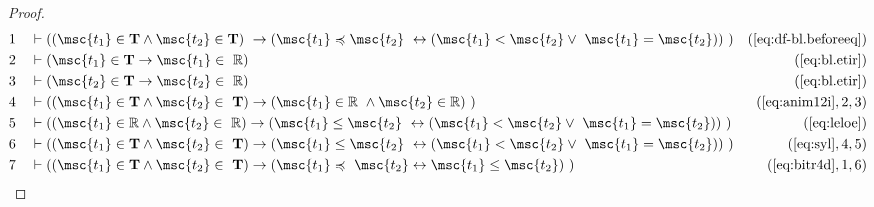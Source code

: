\begin{proof}
\begin{align}
  1 &&  & \vdash ( ( \msc{t_1} \in \mathbf{T} \wedge \msc{t_2} \in \mathbf{T} )
     ~\rightarrow ( \msc{t_1} \preccurlyeq \msc{t_2}
     ~\leftrightarrow ( \msc{t_1} < \msc{t_2} \vee
     ~\msc{t_1} = \msc{t_2} ) )
     ~)&(\mbox{\ref{eq:df-bl.beforeeq}})\notag
  \\ 2 &&  & \vdash ( \msc{t_1} \in \mathbf{T} \rightarrow \msc{t_1} \in
     ~\mathbb{R} )&(\mbox{\ref{eq:bl.etir}})\notag
  \\ 3 &&  & \vdash ( \msc{t_2} \in \mathbf{T} \rightarrow \msc{t_2} \in
     ~\mathbb{R} )&(\mbox{\ref{eq:bl.etir}})\notag
  \\ 4 &&  & \vdash ( ( \msc{t_1} \in \mathbf{T} \wedge \msc{t_2} \in
     ~\mathbf{T} ) \rightarrow ( \msc{t_1} \in \mathbb{R}
     ~\wedge \msc{t_2} \in \mathbb{R} )
     ~)&(\mbox{\ref{eq:anim12i}},2,3)\notag
  \\ 5 &&  & \vdash ( ( \msc{t_1} \in \mathbb{R} \wedge \msc{t_2} \in
     ~\mathbb{R} ) \rightarrow ( \msc{t_1} \le \msc{t_2}
     ~\leftrightarrow ( \msc{t_1} < \msc{t_2} \vee
     ~\msc{t_1} = \msc{t_2} ) )
     ~)&(\mbox{\ref{eq:leloe}})\notag
  \\ 6 &&  & \vdash ( ( \msc{t_1} \in \mathbf{T} \wedge \msc{t_2} \in
     ~\mathbf{T} ) \rightarrow ( \msc{t_1} \le \msc{t_2}
     ~\leftrightarrow ( \msc{t_1} < \msc{t_2} \vee
     ~\msc{t_1} = \msc{t_2} ) )
     ~)&(\mbox{\ref{eq:syl}},4,5)\notag
  \\ 7 &&  & \vdash ( ( \msc{t_1} \in \mathbf{T} \wedge \msc{t_2} \in
     ~\mathbf{T} ) \rightarrow ( \msc{t_1} \preccurlyeq
     ~\msc{t_2} \leftrightarrow \msc{t_1} \le \msc{t_2} )
     ~)&(\mbox{\ref{eq:bitr4d}},1,6)\notag
\end{align}
\end{proof}

